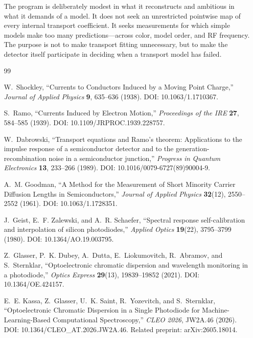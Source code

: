 \documentclass[11pt]{article}
\begin{document}
The program is deliberately modest in what it reconstructs and ambitious in what it demands of a model. It does not seek an unrestricted pointwise map of every internal transport coefficient. It seeks measurements for which simple models make too many predictions---across color, model order, and RF frequency. The purpose is not to make transport fitting unnecessary, but to make the detector itself participate in deciding when a transport model has failed.

\begin{thebibliography}{99}

W.~Shockley, ``Currents to Conductors Induced by a Moving Point Charge,'' \emph{Journal of Applied Physics} \textbf{9}, 635--636 (1938). DOI: 10.1063/1.1710367.

S.~Ramo, ``Currents Induced by Electron Motion,'' \emph{Proceedings of the IRE} \textbf{27}, 584--585 (1939). DOI: 10.1109/JRPROC.1939.228757.

W.~Dabrowski, ``Transport equations and Ramo's theorem: Applications to the impulse response of a semiconductor detector and to the generation-recombination noise in a semiconductor junction,'' \emph{Progress in Quantum Electronics} \textbf{13}, 233--266 (1989). DOI: 10.1016/0079-6727(89)90004-9.

A.~M. Goodman, ``A Method for the Measurement of Short Minority Carrier Diffusion Lengths in Semiconductors,'' \emph{Journal of Applied Physics} \textbf{32}(12), 2550--2552 (1961). DOI: 10.1063/1.1728351.

J.~Geist, E.~F. Zalewski, and A.~R. Schaefer, ``Spectral response self-calibration and interpolation of silicon photodiodes,'' \emph{Applied Optics} \textbf{19}(22), 3795--3799 (1980). DOI: 10.1364/AO.19.003795.

Z.~Glasser, P.~K. Dubey, A.~Dutta, E.~Liokumovitch, R.~Abramov, and S.~Sternklar, ``Optoelectronic chromatic dispersion and wavelength monitoring in a photodiode,'' \emph{Optics Express} \textbf{29}(13), 19839--19852 (2021). DOI: 10.1364/OE.424157.

E.~E. Kassa, Z.~Glasser, U.~K. Saint, R.~Yozevitch, and S.~Sternklar, ``Optoelectronic Chromatic Dispersion in a Single Photodiode for Machine-Learning-Based Computational Spectroscopy,'' \emph{CLEO 2026}, JW2A.46 (2026). DOI: 10.1364/CLEO\_AT.2026.JW2A.46. Related preprint: arXiv:2605.18014.


\end{thebibliography}
\end{document}
